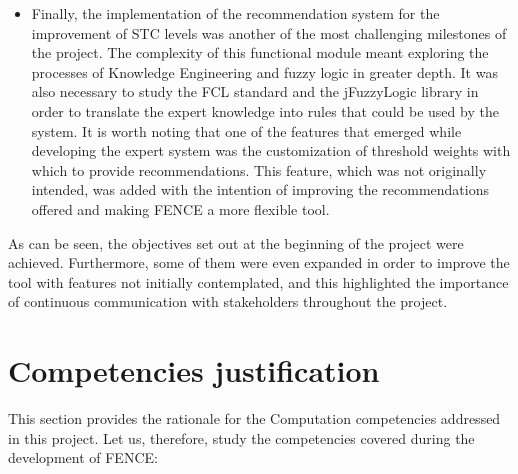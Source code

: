 \begin{itemize}
\item Finally, the implementation of the recommendation system for the improvement of STC levels was another of the most challenging milestones of the project. The complexity of this functional module meant exploring the processes of Knowledge Engineering and fuzzy logic in greater depth. It was also necessary to study the FCL standard and the jFuzzyLogic library in order to translate the expert knowledge into rules that could be used by the system. It is worth noting that one of the features that emerged while developing the expert system was the customization of threshold weights with which to provide recommendations. This feature, which was not originally intended, was added with the intention of improving the recommendations offered and making FENCE a more flexible tool.

\end{itemize}

As can be seen, the objectives set out at the beginning of the project were achieved. Furthermore, some of them were even expanded in order to improve the tool with features not initially contemplated, and this highlighted the importance of continuous communication with stakeholders throughout the project.

\section{Competencies justification}

This section provides the rationale for the Computation competencies addressed in this project. Let us, therefore, study the competencies covered during the development of FENCE:

